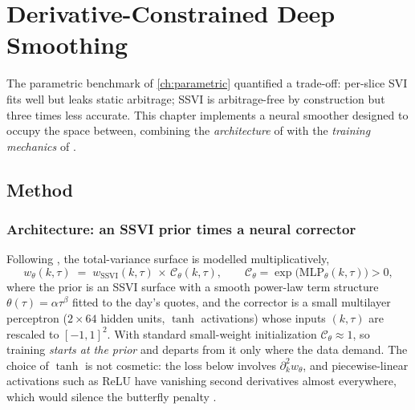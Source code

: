 \chapter{Derivative-Constrained Deep Smoothing}
\label{ch:deepsmoother}

The parametric benchmark of \cref{ch:parametric} quantified a trade-off:
per-slice SVI fits well but leaks static arbitrage; SSVI is arbitrage-free by
construction but three times less accurate. This chapter implements a neural
smoother designed to occupy the space between, combining the
\emph{architecture} of \cite{ackerer2020deep} with the \emph{training
mechanics} of \cite{hoshisashi2024noarbitrage}.

\section{Method}
\label{sec:dsmethod}

\subsection{Architecture: an SSVI prior times a neural corrector}
Following \cite{ackerer2020deep}, the total-variance surface is modelled
multiplicatively,
\begin{equation}
  w_\theta(k,\tau) \;=\; w_{\mathrm{SSVI}}(k,\tau)\,\times\,
  \mathcal C_\theta(k,\tau),
  \qquad
  \mathcal C_\theta = \exp\!\big(\mathrm{MLP}_\theta(k,\tau)\big) > 0,
  \label{eq:priorcorrector}
\end{equation}
where the prior is an SSVI surface with a smooth power-law term structure
$\theta(\tau)=\alpha\tau^{\beta}$ fitted to the day's quotes, and the
corrector is a small multilayer perceptron ($2\times64$ hidden units,
$\tanh$ activations) whose inputs $(k,\tau)$ are rescaled to $[-1,1]^2$.
With standard small-weight initialization $\mathcal C_\theta\approx1$, so
training \emph{starts at the prior} and departs from it only where the data
demand. The choice of $\tanh$ is not cosmetic: the loss below involves
$\partial^2_k w_\theta$, and piecewise-linear activations such as ReLU have
vanishing second derivatives almost everywhere, which would silence the
butterfly penalty \cite{hoshisashi2024noarbitrage}.


